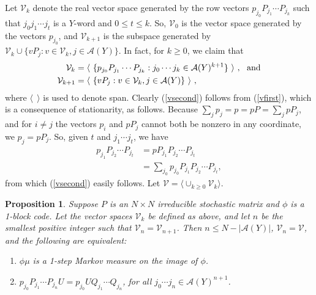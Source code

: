 \documentclass{kepart2010}
\theoremstyle{plain}
\newtheorem{prop}[thm]{Proposition}
\theoremstyle{definition}
\theoremstyle{remark}
\theoremstyle{definition}
\numberwithin{equation}{section}
\begin{document}
Let $\mathcal V_k$ denote the real vector space
generated by the row vectors $p_{j_0}P_{j_1}\cdots P_{j_k} $
 such
that $j_0j_1\cdots j_t$ is a $Y$-word and $0\leq t \leq k$. So,
$\mathcal V_0$ is the vector space generated by the vectors
$p_{j_0}$, and $\mathcal V_{k+1}$ is the subspace generated by
$\mathcal V_k \cup \{vP_j: v\in \mathcal V_k, j\in \mathcal A(Y)\}$.
{}{ In fact, for $k\geq 0$, we claim that
\begin{align}
\label{vfirst}
\mathcal V_k &=
\langle \
\{
p_{j_0}P_{j_1}\cdots P_{j_k}:
j_0\cdots j_k \in \mathcal A(Y)^{k+1}
\}\
\rangle
 \ , \ \textnormal{ and} \\
\label{vsecond}
\mathcal V_{k+1} &=
\langle \
\{
vP_j:
v\in \mathcal V_k, j\in \mathcal A(Y)
\}\
\rangle \ ,
\end{align}
where $\langle \ \ \rangle$ is used to denote span.
Clearly (\ref{vsecond}) follows from (\ref{vfirst}), which
is a consequence of stationarity, as follows.
Because $\sum_jp_j = p = pP =\sum_jpP_j$, and for $i\neq j$
the vectors $p_i$ and $pP_j$ cannot both be nonzero
in any coordinate, we $p_j=pP_j$. So, given $t$ and
$j_1\cdots j_t$, we have
\begin{align*}
p_{j_1}P_{j_2}\cdots P_{j_t} &=
pP_{j_1}P_{j_2}\cdots P_{j_t} \\
&= \sum_{j_0} p_{j_0}P_{j_1}P_{j_2}\cdots P_{j_t} ,
\end{align*}
from which (\ref{vsecond}) easily follows. Let $\mathcal V=
\langle \cup_{k\geq 0}\mathcal V_k\rangle $.
}

\begin{prop} \label{linalgprocedure}
Suppose $P$ is an $N\times N$ irreducible stochastic matrix and
$\phi$ is a 1-block code.
 Let the vector spaces ${{\mathcal V}}_k$ be defined as above, and let
 $n$ be the smallest positive integer such that
$\mathcal V_n=\mathcal V_{n+1}$. Then $n\leq  N -|\mathcal A (Y)|$,
$\mathcal V_n=\mathcal V$, and the following are
equivalent:
\begin{enumerate}
\item
$\phi \mu $ is a 1-step Markov measure on the image  of $\phi$.
\item
$p_{j_0}P_{j_1}\cdots P_{j_n}U = p_{j_0}U
Q_{j_1}\cdots Q_{j_n}$,
for all
$j_0\cdots j_n \in
\mathcal A (Y)^{n+1}$.
\end{enumerate}
\end{prop}
\end{document}
